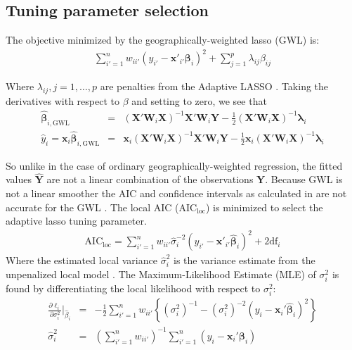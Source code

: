 \documentclass[authoryear, review, 11pt]{elsarticle}
\begin{document}
	\subsection{Tuning parameter selection}
	The objective minimized by the geographically-weighted lasso (GWL) is:	
	\begin{eqnarray}
		\sum_{i'=1}^n w_{ii'} \left(y_{i'} - \bm{x}'_{i'} \bm{\beta}_i \right)^2 + \sum_{j=1}^p \lambda_{ij} \beta_{ij}
	\end{eqnarray}
	
	Where $\lambda_{ij}, j =1, \dots, p$ are penalties from the Adaptive LASSO \citep{Zou:2006}. Taking the derivatives with respect to $\beta$ and setting to zero, we see that
	\begin{eqnarray}
		\hat{\bm{\beta}}_{i, \mbox{GWL}} &=& \left( \bm{X}'\bm{W}_i\bm{X} \right)^{-1}  \bm{X}'\bm{W}_i\bm{Y}  - \frac{1}{2} \left(\bm{X}'\bm{W}_i\bm{X} \right)^{-1} \bm{\lambda}_i\\
		\hat{y}_i = \bm{x}_i \hat{\bm{\beta}}_{i, \mbox{GWL}} &=&  \bm{x}_i \left( \bm{X}'\bm{W}_i\bm{X} \right)^{-1}  \bm{X}'\bm{W}_i\bm{Y}  - \frac{1}{2} \bm{x}_i \left(\bm{X}'\bm{W}_i\bm{X} \right)^{-1} \bm{\lambda}_i
	\end{eqnarray}
	
	So unlike in the case of ordinary geographically-weighted regression, the fitted values $\hat{\bm{Y}}$ are not a linear combination of the observations $\bm{Y}$. Because GWL is not a linear smoother the AIC and confidence intervals as calculated in \cite{Fotheringham:2002} are not accurate for the GWL \citep{Zou:2006}. The local AIC ($\mbox{AIC}_{\mbox{loc}}$) is minimized to select the adaptive lasso tuning parameter.
	\begin{eqnarray}
		\mbox{AIC}_{\mbox{loc}} = \sum_{i'=1}^n w_{ii'} \hat{\sigma}_i^{-2} \left( y_{i'} - \bm{x}'_{i'} \hat{\bm{\beta}}_i \right)^2 + 2 \mbox{df}_i
	\end{eqnarray}	
	Where the estimated local variance $\hat{\sigma}_i^2$ is the variance estimate from the unpenalized local model \citep{Zou:2007}. The Maximum-Likelihood Estimate (MLE) of $\sigma_i^2$ is found by differentiating the local likelihood with respect to $\sigma_i^2$:\\
	
	\begin{eqnarray}
		\frac{\partial \ell_i}{\partial \sigma_i^2} \bigg|_{\hat{\beta}_i} &=& -\frac{1}{2} \sum_{i'=1}^n w_{ii'} \left\{ \left(\sigma_i^{2}\right)^{-1} - \left(\sigma_i^{2}\right)^{-2} \left( y_i - \bm{x}_i'\bm{\hat{\beta}}_i \right)^2 \right\} \\
		\hat{\sigma}_i^2 &=& \left(\sum_{i'=1}^n w_{ii'}\right)^{-1} \sum_{i'=1}^n \left(y_i - \bm{x}_i'\bm{\beta}_i\right)
	\end{eqnarray}
	 
\end{document}
